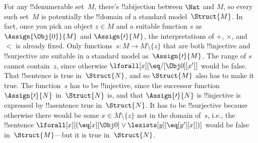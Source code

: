 \documentclass[../../../include/open-logic-section]{subfiles}
\begin{document}
\begin{explain}
For any !!{denumerable} set~$M$, there's !!a{bijection} between
$\Nat$ and $M$, so every such set~$M$ is potentially the !!{domain} of
a standard model~$\Struct{M}$. In fact, once you pick an object $z \in
M$ and a suitable function $s$ as $\Assign{\Obj{0}}{M}$ and
$\Assign{\prime}{M}$, the interpretations of $+$, $\times$, and $<$ is
already fixed.  Only functions~$s\colon M \to M \setminus \{z\}$ that
are both !!{injective} and !!{surjective} are suitable in a standard
model as~$\Assign{\prime}{M}$.  The range of $s$ cannot contain~$z$,
since otherwise $\lforall[x][\eq/[\Obj 0][x']]$ would be false. That
!!{sentence} is true in~$\Struct{N}$, and so $\Struct{M}$ also has to
make it true. The function~$s$ has to be !!{injective}, since the
successor function~$\Assign{\prime}{N}$ in~$\Struct{N}$ is, and that
$\Assign{\prime}{N}$ is !!{injective} is expressed by !!a{sentence}
true in~$\Struct{N}$. It has to be !!{surjective} because otherwise
there would be some $x \in M \setminus \{z\}$ not in the domain
of~$s$, i.e., the !!{sentence} $\lforall[x][(\eq[x][\Obj 0] \lor
\lexists[y][\eq[y'][x]])]$ would be false in~$\Struct{M}$---but it is
true in~$\Struct{N}$.
\end{explain}
\end{document}

